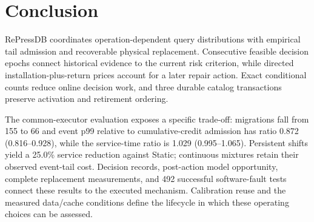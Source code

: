 \section{Conclusion}
RePressDB coordinates operation-dependent query distributions with empirical tail admission and recoverable physical replacement. Consecutive feasible decision epochs connect historical evidence to the current risk criterion, while directed installation-plus-return prices account for a later repair action. Exact conditional counts reduce online decision work, and three durable catalog transactions preserve activation and retirement ordering.

The common-executor evaluation exposes a specific trade-off: migrations fall from 155 to 66 and event p99 relative to cumulative-credit admission has ratio 0.872 (0.816--0.928), while the service-time ratio is 1.029 (0.995--1.065). Persistent shifts yield a 25.0\% service reduction against Static; continuous mixtures retain their observed event-tail cost. Decision records, post-action model opportunity, complete replacement measurements, and 492 successful software-fault tests connect these results to the executed mechanism. Calibration reuse and the measured data/cache conditions define the lifecycle in which these operating choices can be assessed.
